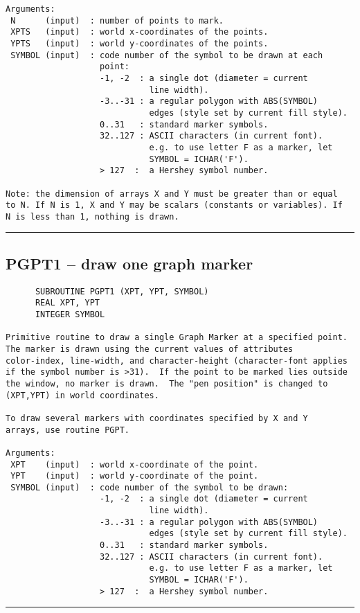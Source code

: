 {\begin{verbatim}
Arguments:
 N      (input)  : number of points to mark.
 XPTS   (input)  : world x-coordinates of the points.
 YPTS   (input)  : world y-coordinates of the points.
 SYMBOL (input)  : code number of the symbol to be drawn at each 
                   point:
                   -1, -2  : a single dot (diameter = current
                             line width).
                   -3..-31 : a regular polygon with ABS(SYMBOL)
                             edges (style set by current fill style).
                   0..31   : standard marker symbols.
                   32..127 : ASCII characters (in current font).
                             e.g. to use letter F as a marker, let
                             SYMBOL = ICHAR('F'). 
                   > 127  :  a Hershey symbol number.

Note: the dimension of arrays X and Y must be greater than or equal
to N. If N is 1, X and Y may be scalars (constants or variables). If
N is less than 1, nothing is drawn.
\end{verbatim}
\hrule


\subsection*{PGPT1 -- draw one graph marker }
\begin{verbatim}
      SUBROUTINE PGPT1 (XPT, YPT, SYMBOL)
      REAL XPT, YPT
      INTEGER SYMBOL

Primitive routine to draw a single Graph Marker at a specified point.
The marker is drawn using the current values of attributes
color-index, line-width, and character-height (character-font applies
if the symbol number is >31).  If the point to be marked lies outside
the window, no marker is drawn.  The "pen position" is changed to
(XPT,YPT) in world coordinates.

To draw several markers with coordinates specified by X and Y
arrays, use routine PGPT.

Arguments:
 XPT    (input)  : world x-coordinate of the point.
 YPT    (input)  : world y-coordinate of the point.
 SYMBOL (input)  : code number of the symbol to be drawn:
                   -1, -2  : a single dot (diameter = current
                             line width).
                   -3..-31 : a regular polygon with ABS(SYMBOL)
                             edges (style set by current fill style).
                   0..31   : standard marker symbols.
                   32..127 : ASCII characters (in current font).
                             e.g. to use letter F as a marker, let
                             SYMBOL = ICHAR('F'). 
                   > 127  :  a Hershey symbol number.
\end{verbatim}
\hrule


}
